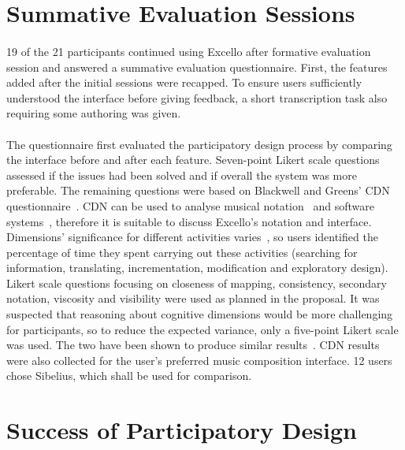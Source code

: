 \section{Summative Evaluation Sessions}

\paragraph{} 19 of the 21 participants continued using Excello after formative evaluation session and answered a summative evaluation questionnaire. First, the features added after the initial sessions were recapped. To ensure users sufficiently understood the interface before giving feedback, a short transcription task also requiring some authoring was given.

\paragraph{} The questionnaire first evaluated the participatory design process by comparing the interface before and after each feature. Seven-point Likert scale questions assessed if the issues had been solved and if overall the system was more preferable. The remaining questions were based on Blackwell and Greens' CDN questionnaire~\cite{blackwell:questionnaire}. CDN can be used to analyse musical notation~\cite{blackwell:notation} and software systems~\cite{green:cdn}, therefore it is suitable to discuss Excello's notation and interface. Dimensions' significance for different activities varies~\cite{blackwell:tutorial}, so users identified the percentage of time they spent carrying out these activities (searching for information, translating, incrementation, modification and exploratory design). Likert scale questions focusing on closeness of mapping, consistency, secondary notation, viscosity and visibility were used as planned in the proposal. It was suspected that reasoning about cognitive dimensions would be more challenging for participants, so to reduce the expected variance, only a five-point Likert scale was used. The two have been shown to produce similar results~\cite{dawes:points}. CDN results were also collected for the user's preferred music composition interface. 12 users chose Sibelius, which shall be used for comparison.

\section{Success of Participatory Design}

